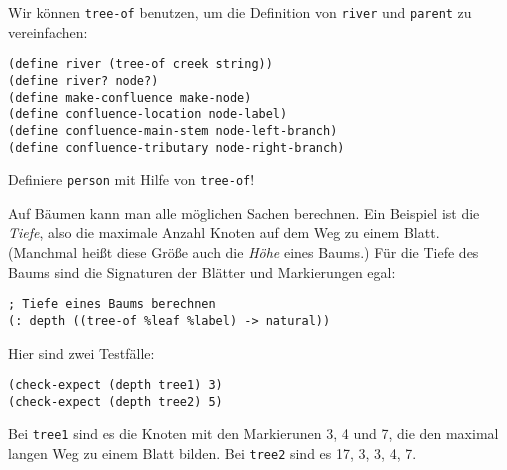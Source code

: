 Wir können \lstinline{tree-of} benutzen, um die Definition von
\lstinline{river} und \lstinline{parent} zu vereinfachen:
%
\begin{lstlisting}
(define river (tree-of creek string))
(define river? node?)
(define make-confluence make-node)
(define confluence-location node-label)
(define confluence-main-stem node-left-branch)
(define confluence-tributary node-right-branch)
\end{lstlisting}
%
\begin{aufgabeinline}
  Definiere \lstinline{person} mit Hilfe von \lstinline{tree-of}!
\end{aufgabeinline}
%
Auf Bäumen kann man alle möglichen Sachen berechnen.  Ein Beispiel ist
die \textit{Tiefe}, also die maximale Anzahl
Knoten auf dem Weg zu einem Blatt.  (Manchmal heißt diese Größe auch
die \textit{Höhe} eines Baums.)  Für die Tiefe
des Baums sind die Signaturen der Blätter und Markierungen egal:
%
\begin{lstlisting}
; Tiefe eines Baums berechnen
(: depth ((tree-of %leaf %label) -> natural))
\end{lstlisting}
%
Hier sind zwei Testfälle:
%
\begin{lstlisting}
(check-expect (depth tree1) 3)
(check-expect (depth tree2) 5)
\end{lstlisting}
%
Bei \lstinline{tree1} sind es die Knoten mit den Markierunen 3, 4 und
7, die den maximal langen Weg zu einem Blatt bilden.  Bei
\lstinline{tree2} sind es 17, 3, 3, 4, 7.


